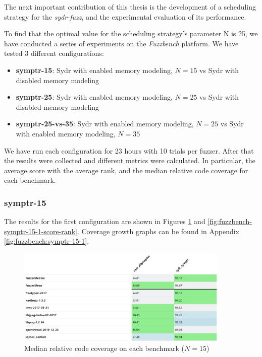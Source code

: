 The next important contribution of this thesis is the development of a scheduling strategy for the \textit{sydr-fuzz}, and the experimental evaluation of its performance.

To find that the optimal value for the scheduling strategy's parameter N is 25, we have conducted a series of experiments on the \textit{Fuzzbench} platform. We have tested 3 different configurations:

\begin{itemize}
    \item \textbf{symptr-15}: Sydr with enabled memory modeling, $N=15$ vs Sydr with disabled memory modeling
    \item \textbf{symptr-25}: Sydr with enabled memory modeling, $N=25$ vs Sydr with disabled memory modeling
    \item \textbf{symptr-25-vs-35}: Sydr with enabled memory modeling, $N=25$ vs Sydr with enabled memory modeling, $N=35$
\end{itemize}

We have run each configuration for 23 hours with 10 trials per fuzzer. After that the results were collected and different metrics were calculated. In particular, the average score with the average rank, and the median relative code coverage for each benchmark.

\subsubsection{symptr-15}

The results for the first configuration are shown in Figures \ref{fig:fuzzbench-symptr-15-1-coverage} and \ref{fig:fuzzbench-symptr-15-1-score-rank}. Coverage growth graphs can be found in Appendix \ref{fig:fuzzbench:symptr-15-1}.

\begin{figure}[h]
    \centering
    \includegraphics[width=0.9\textwidth]{assets/fuzzbench/symptr-15-1/median-relative-code-coverage-on-each-benchmark.png}
    \caption{Median relative code coverage on each benchmark ($N=15$)}
    \label{fig:fuzzbench-symptr-15-1-coverage}
\end{figure}

